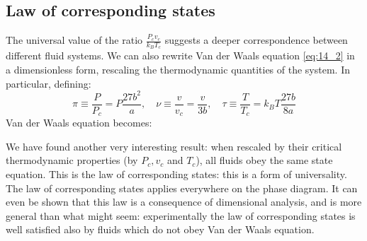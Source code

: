 \documentclass[../../Main/Main.tex]{subfiles}
\begin{document}
\subsection{Law of corresponding states}
The universal value of the ratio \( \frac{P_c v_c}{k_B T_c} \) suggests a deeper correspondence between different fluid systems.
We can also rewrite Van der Waals equation \eqref{eq:14_2} in a dimensionless form, rescaling the thermodynamic quantities of the system. In particular, defining:
\begin{equation}
  \pi \equiv \frac{P}{P_c}= P\frac{27b^2}{a}, \quad \nu  \equiv \frac{v}{v_c} = \frac{v}{3b}, \quad \tau \equiv \frac{T}{T_c} = k_B T\frac{27b}{8a}
\end{equation}
Van der Waals equation becomes:
We have found another very interesting result: when rescaled by their critical thermodynamic properties (by \( P_c, v_c \) and \( T_c \)), all fluids obey the same state equation. This is the law of corresponding states: this is a form of universality. The law of corresponding states applies everywhere on the phase diagram. It can even be shown that this law is a consequence of dimensional analysis, and is more general than what might seem: experimentally the law of corresponding states is well satisfied also by fluids which do not obey Van der Waals equation.
\end{document}
